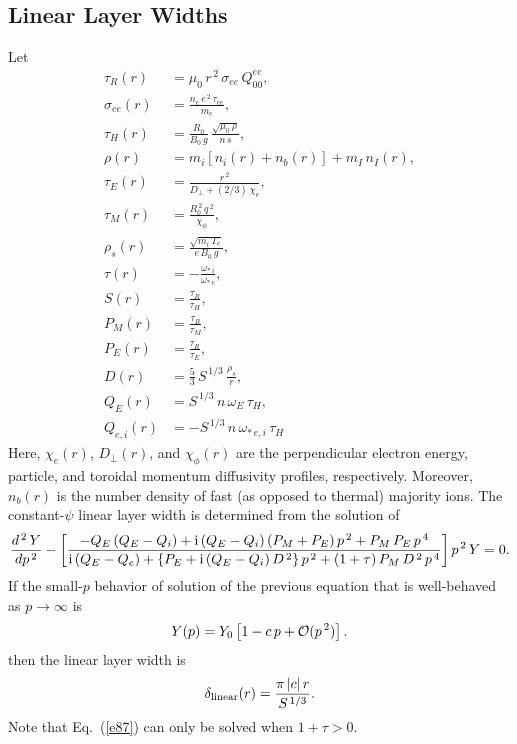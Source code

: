 \documentclass[notitlepage,12pt]{article}
\begin{document}
\subsection{Linear Layer Widths}\label{linear}
Let
\begin{align}
\tau_R(r) &= \mu_0\,r^{\,2}\,\sigma_{ee}\,Q_{00}^{ee},\\[0.5ex]
\sigma_{ee}(r) &=\frac{n_e\,e^{\,2}\,\tau_{ee}}{m_e},\\[0.5ex]
\tau_H(r) &= \frac{R_0}{B_0\,g}\,\frac{\sqrt{\mu_0\,\rho}}{n\,s},\\[0.5ex]
\rho(r)&= m_i\left[n_i(r) + n_b(r)\right] + m_I\,n_I(r),\\[0.5ex]
\tau_E(r) &= \frac{r^{\,2}}{D_\perp + (2/3)\,\chi_e},\\[0.5ex]
\tau_M(r) &= \frac{R_0^{\,2}\,q^{\,2}}{\chi_\phi},\\[0.5ex]
\rho_s (r)&= \frac{\sqrt{m_i\,T_e}}{e\,B_0\,g},\\[0.5ex]
\tau(r)& = -\frac{\omega_{\ast\,i}}{\omega_{\ast\,e}},\\[0.5ex]
S(r) &= \frac{\tau_R}{\tau_H},\\[0.5ex]
P_M(r) &= \frac{\tau_R}{\tau_M},\\[0.5ex]
P_E(r) &= \frac{\tau_R}{\tau_E},\\[0.5ex]
D(r)&= \frac{5}{3}\,S^{\,1/3}\,\frac{\rho_s}{r},\\[0.5ex]
Q_E(r)&= S^{\,1/3}\,n\,\omega_E\,\tau_H,\\[0.5ex]
Q_{e,i}(r)&= -S^{\,1/3}\,n\,\omega_{\ast\,e,i}\,\tau_H
\end{align}
Here, $\chi_e(r)$, $D_\perp(r)$, and $\chi_\phi(r)$ are the perpendicular electron energy, particle,
and toroidal momentum diffusivity profiles, respectively. Moreover, $n_b(r)$ is the number density of fast (as opposed to thermal) majority ions. 
The constant-$\psi$ linear layer width is determined from the solution of
\begin{equation}\label{e87}
\frac{d^{\,2}\,Y}{dp^{\,2}} -\left[\frac{-Q_E\,(Q_E-Q_i)+{\rm i}\,(Q_E-Q_i)\,(P_M+P_E)\,p^{\,2}+
P_M\,P_E\,p^{\,4}}
{{\rm i}\,(Q_E-Q_e) +\{P_E + {\rm i}\,(Q_E-Q_i)\,D^{\,2}\}\,p^{\,2}+(1+\tau)\,P_M\,D^{\,2}\,p^{\,4}}
\right] p^{\,2}\, Y = 0.
\end{equation}
If the small-$p$ behavior of solution of the previous equation that is well-behaved as $p\rightarrow \infty$ is
\begin{equation}
Y(p) = Y_0\left[1 - c\,p+{\cal O}(p^{\,2})\right].
\end{equation}
then the 
linear layer width is 
\begin{equation}
\delta_{\rm linear}(r) = \frac{\pi\,|c|\,r}{S^{\,1/3}}.
\end{equation}
Note that Eq.~(\ref{e87}) can only be solved when $1+\tau>0$. 
\end{document}
